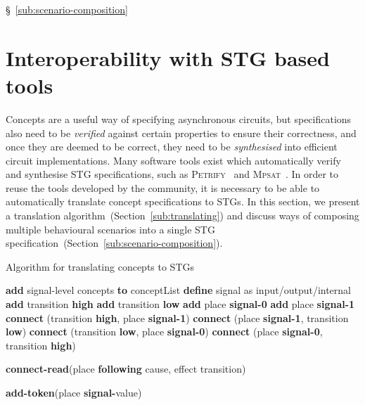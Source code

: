 \documentclass[british, journal]{IEEEtran}
\newcommand{\noun}[1]{\textsc{#1}}
\begin{document}
\S~\ref{sub:scenario-composition}
\vspace{-1mm}
\section{Interoperability with STG based tools\label{sec:interop-with-stg}}

Concepts are a useful way of specifying asynchronous circuits, but
specifications also need to be \emph{verified} against certain properties to
ensure
their correctness, and once they are deemed to be correct, they need to
be \emph{synthesised} into efficient circuit implementations. Many software
tools exist which automatically verify and synthesise STG specifications,
such as \noun{Petrify}~\cite{Cortadella} and
\noun{Mpsat}~\cite{khomenko2004detecting}.
In order to reuse the tools developed by the community, it is
necessary to be able to automatically translate concept specifications to STGs.
In this section, we present a translation
algorithm~(Section~\ref{sub:translating})
and discuss ways of composing multiple behavioural scenarios into a single STG
specification~(Section~\ref{sub:scenario-composition}).

\begin{algorithm}[t]
\begin{algorithmic}
\caption{Algorithm for translating concepts to STGs\label{alg:translation}}
  \State \textbf{add} signal-level concepts \textbf{to} conceptList
\EndFor
  \State \textbf{define} signal as input/output/internal
  \State \textbf{add} transition \textbf{high}
  \State \textbf{add} transition \textbf{low}
  \State \textbf{add} place \textbf{signal-0}
  \State \textbf{add} place \textbf{signal-1}
  \State \textbf{connect} (transition \textbf{high}, place \textbf{signal-1})
  \State \textbf{connect} (place \textbf{signal-1}, transition \textbf{low})
  \State \textbf{connect} (transition \textbf{low}, place \textbf{signal-0})
  \State \textbf{connect} (place \textbf{signal-0}, transition \textbf{high})
\EndFor

\State \textbf{connect-read}(place \textbf{following} cause, effect transition)\EndFor

  \State \textbf{add-token}(place \textbf{signal-}value)
\EndFor

\end{algorithmic}
\end{algorithm}
\end{document}
